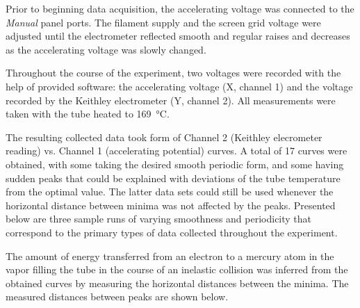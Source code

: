\begin{paper}
	Prior to beginning data acquisition, the accelerating voltage was connected to the \textit{Manual} panel ports. The filament supply and the screen grid voltage were adjusted until the electrometer reflected smooth and regular raises and decreases as the accelerating voltage was slowly changed. 
	
	Throughout the course of the experiment, two voltages were recorded with the help of provided software: the accelerating voltage (X, channel 1) and the voltage recorded by the Keithley electrometer (Y, channel 2). All measurements were taken with the tube heated to \SI{169}{\celsius}.

	
	The resulting collected data took form of Channel 2 (Keithley elecrometer reading) vs. Channel 1 (accelerating potential) curves. A total of 17 curves were obtained, with some taking the desired smooth periodic form, and some having sudden peaks that could be explained with deviations of the tube temperature from the optimal value. The latter data sets could still be used whenever the horizontal distance between minima was not affected by the peaks. Presented below are three sample runs of varying smoothness and periodicity that correspond to the primary types of data collected throughout the experiment.  
	
	
	
	
	The amount of energy transferred from an electron to a mercury atom in the vapor filling the tube in the course of an inelastic collision was inferred from the obtained curves by measuring the horizontal distances between the minima. The measured distances between peaks are shown below. \vspace{1em}
	

\end{paper}
